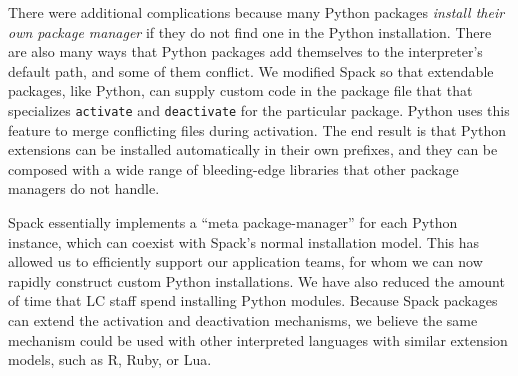 There were additional complications because many Python packages {\it install their own
package manager} if they do not find one in the Python installation.
There are also many ways that Python packages add themselves to the
interpreter's default path, and some of them conflict. We modified
Spack so that extendable packages, like Python, can supply custom code
in the package file that that specializes {\tt activate} and {\tt deactivate}
for the particular package. Python uses this feature to merge conflicting
files during activation.  The end result is that Python extensions can
be installed automatically in their own prefixes, and they can be composed
with a wide range of bleeding-edge libraries that other package managers do
not handle.


Spack essentially implements a ``meta package-manager'' for each Python
instance, which can coexist with Spack's normal installation model.
This has allowed us to efficiently support our application teams, for whom we can
now rapidly construct custom Python installations.  We have also reduced
the amount of time that LC staff spend installing Python modules.
Because Spack packages can extend the activation and deactivation mechanisms,
we believe the same mechanism could be used with other 
interpreted languages with similar extension models, such as R, Ruby, or Lua.




















